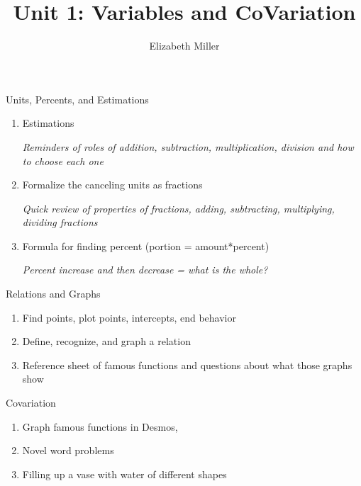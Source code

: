 \documentclass{ximera}
\author{Elizabeth Miller}
\title{Unit 1: Variables and CoVariation}
\begin{document}
\begin{abstract}
\end{abstract}
\maketitle

\begin{overview}
\item Units, Percents, and Estimations %
	\begin{enumerate}
	\item Estimations 
	
	\textit{Reminders of roles of addition, subtraction, multiplication, division and how to choose each one} 
	
	\item Formalize the canceling units as fractions 
	
	\textit{Quick review of properties of fractions, adding, subtracting, multiplying, dividing fractions} 
	
	\item Formula for finding percent (portion = amount*percent) 
	
	\textit{Percent increase and then decrease = what is the whole?} 
	\end{enumerate}
	
\item Relations and Graphs %
	\begin{enumerate}
	
	\item Find points, plot points, intercepts, end behavior 

	\item Define, recognize, and graph a relation

	\item Reference sheet of famous functions and questions about what those graphs show 
	\end{enumerate} 

\item Covariation %
	\begin{enumerate}
	\item Graph famous functions in Desmos, %
	
	
	\item Novel word problems  %
	
	\item Filling up a vase with water of different shapes 
	\end{enumerate} 
\end{overview}
\end{document}
